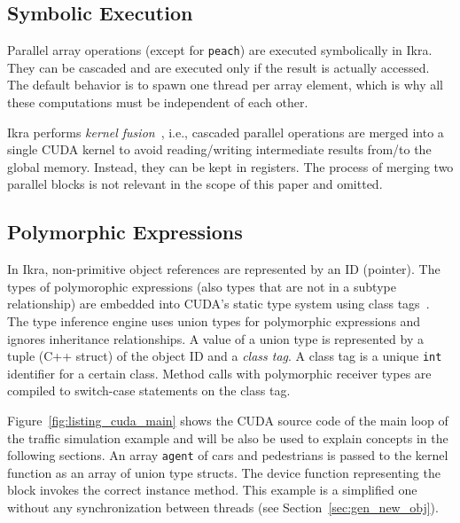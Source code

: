 \documentclass[preprint]{sigplanconf}
\begin{document}
\subsection{Symbolic Execution}
Parallel array operations (except for \texttt{peach}) are executed symbolically in Ikra. They can be cascaded and are executed only if the result is actually accessed. The default behavior is to spawn one thread per array element, which is why all these computations must be independent of each other. 

Ikra performs \emph{kernel fusion}~\cite{Wu:2012:KWA:2457472.2457490, Wahib:2014:SKF:2683593.2683615}, i.e., cascaded parallel operations are merged into a single CUDA kernel to avoid reading/writing intermediate results from/to the global memory. Instead, they can be kept in registers. The process of merging two parallel blocks is not relevant in the scope of this paper and omitted.

\subsection{Polymorphic Expressions}
\label{sec:polymorphic}
In Ikra, non-primitive object references are represented by an ID (pointer). The types of polymorophic expressions (also types that are not in a subtype relationship) are embedded into CUDA's static type system using class tags~\cite{Abadi:1989:DTS:75277.75296}. The type inference engine uses union types for polymorphic expressions and ignores inheritance relationships. A value of a union type is represented by a tuple (C++ struct) of the object ID and a \emph{class tag}. A class tag is a unique \texttt{int} identifier for a certain class. Method calls with polymorphic receiver types are compiled to switch-case statements on the class tag.

Figure~\ref{fig:listing_cuda_main} shows the CUDA source code of the main loop of the traffic simulation example and will be also be used to explain concepts in the following sections. An array \texttt{agent} of cars and pedestrians is passed to the kernel function as an array of union type structs. The device function representing the block invokes the correct instance method. This example is a simplified one without any synchronization between threads (see Section~\ref{sec:gen_new_obj}).
\end{document}
